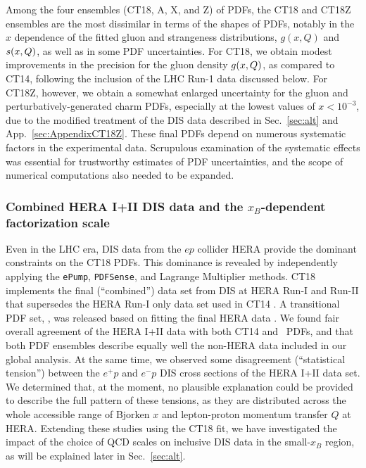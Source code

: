 Among the four ensembles (CT18, A, X, and Z) of PDFs,  the CT18 and CT18Z ensembles are the most dissimilar in terms of the shapes of PDFs, notably in the $x$ dependence of the fitted gluon and strangeness
distributions, $g(x,Q)$ and $s(x,Q)$, as well as in some PDF uncertainties. For CT18, we obtain modest improvements in the precision
for the gluon density $g(x,Q)$, as compared to CT14, following the inclusion of the LHC Run-1 data discussed below. For CT18Z, however, we obtain a somewhat enlarged uncertainty for the gluon and perturbatively-generated charm PDFs, especially at the lowest values
of $x\! <\! 10^{-3}$, due to the modified treatment of the DIS data described in
Sec.~\ref{sec:alt} and App.~\ref{sec:AppendixCT18Z}.
These final PDFs depend on numerous systematic factors in the experimental data. Scrupulous examination of the systematic effects was essential for trustworthy estimates of PDF uncertainties, 
and the scope of numerical computations also needed to be expanded. 

\subsubsection{\label{sec:summary-HERA2} Combined HERA I+II DIS data and the $x_B$-dependent factorization scale }
Even in the LHC era, DIS data from the $ep$ collider HERA provide the dominant
constraints on the CT18 PDFs. This dominance is revealed by independently applying the \texttt{ePump}, \texttt{PDFSense},  and Lagrange Multiplier methods.
CT18 implements the final (``combined'') data set from DIS at
HERA Run-I and Run-II \cite{Abramowicz:2015mha} that supersedes the HERA Run-I
only data set \cite{Aaron:2009aa} used in CT14 \cite{Dulat:2015mca}.
A transitional PDF set, \CTHERAII, was released based on fitting the
final HERA data \cite{Hou:2016nqm}. We found fair overall agreement of the HERA I+II
data with both CT14 and \CTHERAII~PDFs, and that both PDF ensembles
describe equally well the non-HERA data included in our global analysis.
At the same time, we observed some disagreement (``statistical tension'') 
between the $e^{+}p$ and $e^{-}p$ DIS cross sections of the HERA I+II data set. 
We determined that, at the moment, no plausible explanation could be provided to describe 
the full pattern of these tensions, as they are distributed across
the whole accessible range of Bjorken $x$ and lepton-proton momentum
transfer $Q$ at HERA.
Extending these studies using the CT18 fit, we have investigated the impact of the choice of
QCD scales on inclusive DIS data in the small-$x_B$ region, as will be explained later in
Sec.~\ref{sec:alt}.

